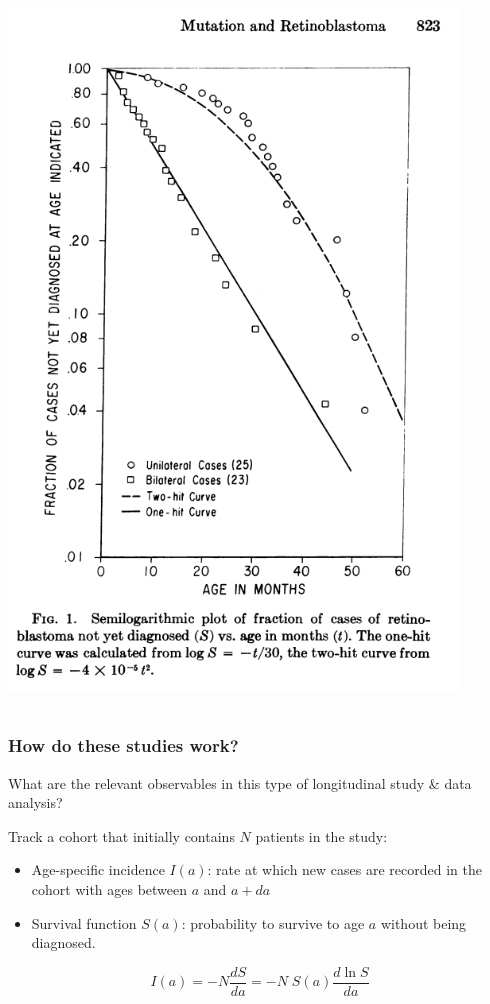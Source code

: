 \documentclass{beamer}
\begin{document}
\begin{frame}
\begin{columns}
\begin{column}{0.5\textwidth}
            \includegraphics[width=0.90\textwidth]{figures/Screenshot_2022-10-31_11-57-01.png}
        \end{column}
    \end{columns}

\end{frame}

\begin{frame}
    \frametitle{How do these studies work?}

    What are the relevant observables in this type of longitudinal study \& data
    analysis? 

    Track a cohort that initially contains $N$ patients in the study:

    \begin{itemize}
        \item Age-specific incidence $I(a)$: rate at which new cases are
        recorded in the cohort with ages between $a$ and $a + da$
        \item Survival function $S(a)$: probability to survive to age $a$
        without being diagnosed.
    \end{itemize}

    \begin{equation}
        I(a) = -N \frac{dS}{da} = -N\; S(a) \frac{d \ln S}{da}
    \end{equation}
\end{frame}
\end{document}

